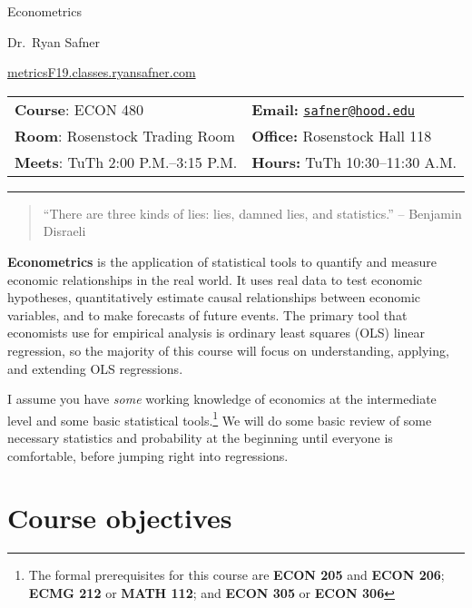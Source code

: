 \documentclass{article}
\begin{document}
\sffamily

\centerline{\Huge Econometrics}

\vspace{3 mm}

\centerline{\large Dr.~Ryan Safner}
\vspace{2 mm}
\centerline{\large \href{http://metricsf19.classes.ryansafner.com}{metricsF19.classes.ryansafner.com}}

\vspace{5 mm}

\begin{tabular}{@{}p{3.5in}p{3.5in}}           
\textbf{Course}: ECON 480  & \textbf{Email:}  \href{mailto:safner@hood.edu}{\nolinkurl{safner@hood.edu}}\\
\textbf{Room}: Rosenstock Trading Room & \textbf{Office:}  Rosenstock Hall 118\\
\textbf{Meets}: TuTh 2:00 P.M.--3:15 P.M. & \textbf{Hours:} TuTh 10:30--11:30 A.M.\\ 
\end{tabular}

\vspace{5 mm}

\hrule


\begin{quote}
``There are three kinds of lies: lies, damned lies, and statistics.'' --
Benjamin Disraeli
\end{quote}

\textbf{Econometrics} is the application of statistical tools to
quantify and measure economic relationships in the real world. It uses
real data to test economic hypotheses, quantitatively estimate causal
relationships between economic variables, and to make forecasts of
future events. The primary tool that economists use for empirical
analysis is ordinary least squares (OLS) linear regression, so the
majority of this course will focus on understanding, applying, and
extending OLS regressions.

I assume you have \emph{some} working knowledge of economics at the
intermediate level and some basic statistical tools.\footnote{The formal
  prerequisites for this course are \textbf{ECON 205} and \textbf{ECON
  206}; \textbf{ECMG 212} or \textbf{MATH 112}; and \textbf{ECON 305} or
  \textbf{ECON 306}} We will do some basic review of some necessary
statistics and probability at the beginning until everyone is
comfortable, before jumping right into regressions.

\hypertarget{course-objectives}{%
\section{Course objectives}\label{course-objectives}}
\end{document}
